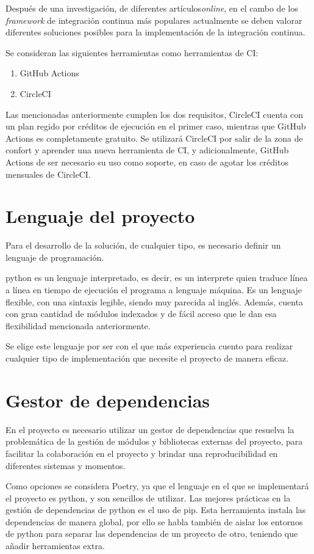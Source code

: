 Después de una investigación, de diferentes artículos\emph{online}, en el cambo de los \emph{\gls{framework}} de integración continua más populares actualmente se deben valorar diferentes soluciones posibles para la implementación de la integración continua. \cite{CIKumar2023}\cite{CITaylor2023}\cite{CIRoddewig2023}

Se consideran las siguientes herramientas como herramientas de CI:
\begin{enumerate}
    \item GitHub Actions
    \item CircleCI
\end{enumerate}

Las mencionadas anteriormente cumplen los dos requisitos, CircleCI cuenta con un plan regido por créditos de ejecución en el primer caso, mientras que GitHub Actions es completamente gratuito. Se utilizará CircleCI por salir de la zona de confort y aprender una nueva herramienta de CI, y adicionalmente, GitHub Actions de ser necesario su uso como soporte, en caso de agotar los créditos mensuales de CircleCI. 

\section{Lenguaje del proyecto}
Para el desarrollo de la solución, de cualquier tipo, es necesario definir un lenguaje de programación. 

\Gls{python} es un lenguaje interpretado, es decir, es un interprete quien traduce línea a línea en tiempo de ejecución el programa a lenguaje máquina. Es un lenguaje flexible, con una sintaxis legible, siendo muy parecida al inglés. Además, cuenta con gran cantidad de módulos indexados y de fácil acceso que le dan esa flexibilidad mencionada anteriormente.

Se elige este lenguaje por ser con el que más experiencia cuento para realizar cualquier tipo de implementación que necesite el proyecto de manera eficaz.

\section{Gestor de dependencias}
En el proyecto es necesario utilizar un gestor de dependencias que resuelva la problemática de la gestión de módulos y bibliotecas externas del proyecto, para facilitar la colaboración en el proyecto y brindar una reproducibilidad en diferentes sistemas y momentos. 

Como opciones se considera Poetry, ya que el lenguaje en el que se implementará el proyecto es \Gls{python}, y son sencillos de utilizar. Las mejores prácticas en la gestión de dependencias de \Gls{python} es el uso de pip. Esta herramienta instala las dependencias de manera global, por ello se habla también de aislar los entornos de \Gls{python} para separar las dependencias de un proyecto de otro, teniendo que añadir herramientas extra. 

